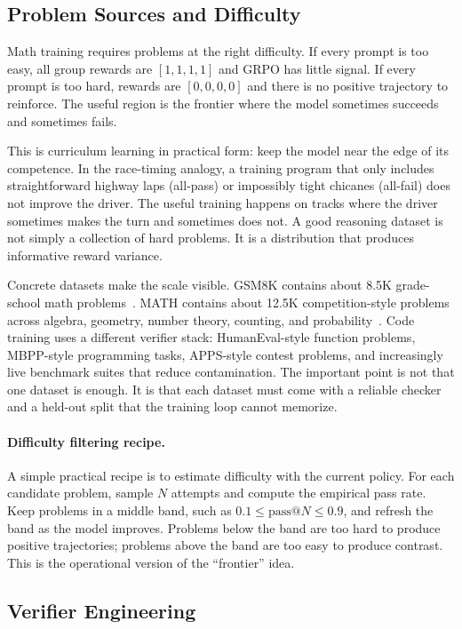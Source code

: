 \subsection{Problem Sources and Difficulty}

Math training requires problems at the right difficulty. If every prompt is too easy, all group rewards are $[1,1,1,1]$ and GRPO has little signal. If every prompt is too hard, rewards are $[0,0,0,0]$ and there is no positive trajectory to reinforce. The useful region is the frontier where the model sometimes succeeds and sometimes fails.

This is curriculum learning in practical form: keep the model near the edge of its competence. In the race-timing analogy, a training program that only includes straightforward highway laps (all-pass) or impossibly tight chicanes (all-fail) does not improve the driver. The useful training happens on tracks where the driver sometimes makes the turn and sometimes does not. A good reasoning dataset is not simply a collection of hard problems. It is a distribution that produces informative reward variance.

Concrete datasets make the scale visible. GSM8K contains about 8.5K grade-school math problems~\cite{cobbe2021gsm8k}. MATH contains about 12.5K competition-style problems across algebra, geometry, number theory, counting, and probability~\cite{hendrycks2021math}. Code training uses a different verifier stack: HumanEval-style function problems, MBPP-style programming tasks, APPS-style contest problems, and increasingly live benchmark suites that reduce contamination. The important point is not that one dataset is enough. It is that each dataset must come with a reliable checker and a held-out split that the training loop cannot memorize.

\paragraph{Difficulty filtering recipe.} A simple practical recipe is to estimate difficulty with the current policy. For each candidate problem, sample $N$ attempts and compute the empirical pass rate. Keep problems in a middle band, such as $0.1 \leq \text{pass@}N \leq 0.9$, and refresh the band as the model improves. Problems below the band are too hard to produce positive trajectories; problems above the band are too easy to produce contrast. This is the operational version of the ``frontier'' idea.

\subsection{Verifier Engineering}

